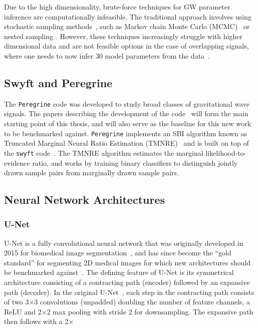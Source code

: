 Due to the high dimensionality, brute-force techniques for GW parameter inference are computationally infeasible. The traditional approach involves using stochastic sampling methods~\cite{Thrane_Talbot_2019}, such as Markov chain Monte Carlo (MCMC)~\cite{Metropolis_1953,Hastings_1970} or nested sampling \cite{Skilling_2004}. However, these techniques increasingly struggle with higher dimensional data and are not feasible options in the case of overlapping signals, where one needs to now infer 30 model parameters from the data~\cite{alvey2023things}.


\subsection{Swyft and Peregrine}

The \texttt{Peregrine} code was developed to study broad classes of gravitational wave signals. The papers describing the development of the code~\cite{bhardwaj2023peregrine,alvey2023things} will form the main starting point of this thesis, and will also serve as the baseline for this new work to be benchmarked against. \texttt{Peregrine} implements an SBI algorithm known as Truncated Marginal Neural Ratio Estimation (TMNRE)~\cite{Miller_TMNRE_2021} and is built on top of the \texttt{swyft} code~\cite{Miller2022}. The TMNRE algorithm estimates the marginal likelihood-to-evidence ratio, and works by training binary classifiers to distinguish jointly drawn sample pairs from marginally drawn sample pairs.


\subsection{Neural Network Architectures}

\subsubsection{U-Net}

U-Net is a fully convolutional neural network that was originally developed in 2015 for biomedical image segmentation~\cite{Ronneberger_Fischer_Brox_2015}, and has since become the \enquote{gold standard} for segmenting 2D medical images for which new architectures should be benchmarked against~\cite{Sengara_2022}. The defining feature of U-Net is its symmetrical architecture consisting of a contracting path (encoder) followed by an expansive path (decoder). In the original U-Net~\cite{Ronneberger_Fischer_Brox_2015}, each step in the contracting path consists of two 3$\times$3 convolutions (unpadded) doubling the number of feature channels, a ReLU and 2$\times$2 max pooling with stride 2 for downsampling. The expansive path then follows with a 2$\times$


